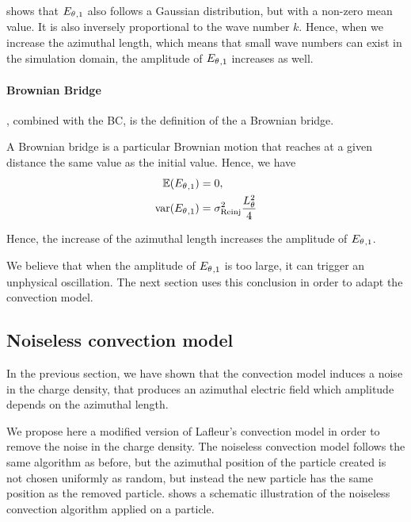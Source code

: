        shows that ${E_{\theta}}_{, 1}$ also follows a Gaussian distribution, but with a non-zero mean value.
      It is also inversely proportional to the wave number $k$.
      Hence, when we increase the azimuthal length, which means that small wave numbers can exist in the simulation domain, the amplitude of ${E_{\theta}}_{, 1}$ increases as well.
      
    \paragraph{Brownian Bridge\\}
      , combined with the \ac{BC}, is the definition of the a Brownian bridge.
      
      A Brownian bridge is a particular Brownian motion that reaches at a given distance the same value as the initial value.
      Hence, we have \citep{ibe2013}
      \begin{align*}
        \mathbb{E}({E_{\theta}}_{, 1}) &= 0,  \\
        {\rm var}({E_{\theta}}_{, 1}) &= \sigma_{\rm Reinj}^2 \frac{L_{\theta}^2}{4}
      \end{align*}
    
      Hence, the increase of the azimuthal length increases the amplitude of ${E_{\theta}}_{, 1}$.
      
    
    We believe that when the amplitude of ${E_{\theta}}_{, 1}$ is too large, it can trigger an unphysical oscillation.
    The next section uses this conclusion in order to adapt the convection model.
    
    \subsection{Noiseless convection model}
      \label{sec-noiselessresults}
      In the previous section, we have shown that the convection model induces a noise in the charge density, that produces an azimuthal electric field which amplitude depends on the azimuthal length.
      
      We propose here a modified version of Lafleur's convection model in order to remove the noise in the charge density.
      The noiseless convection model follows the same algorithm as before, but the azimuthal position of the particle created is not chosen uniformly as random, but instead the new particle has the same position as the removed particle.
       shows a schematic illustration of the noiseless convection algorithm applied on a particle.
      
